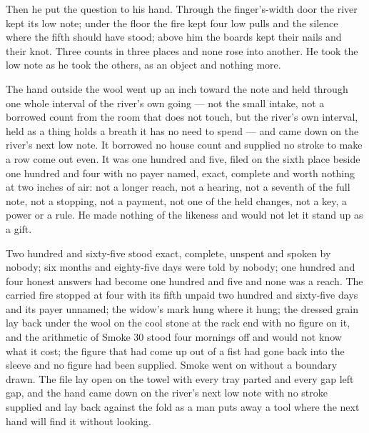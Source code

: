Then he put the question to his hand. Through the finger's-width door the river kept its low note; under the floor the fire kept four low pulls and the silence where the fifth should have stood; above him the boards kept their nails and their knot. Three counts in three places and none rose into another. He took the low note as he took the others, as an object and nothing more.

The hand outside the wool went up an inch toward the note and held through one whole interval of the river's own going --- not the small intake, not a borrowed count from the room that does not touch, but the river's own interval, held as a thing holds a breath it has no need to spend --- and came down on the river's next low note. It borrowed no house count and supplied no stroke to make a row come out even. It was one hundred and five, filed on the sixth place beside one hundred and four with no payer named, exact, complete and worth nothing at two inches of air: not a longer reach, not a hearing, not a seventh of the full note, not a stopping, not a payment, not one of the held changes, not a key, a power or a rule. He made nothing of the likeness and would not let it stand up as a gift.

Two hundred and sixty-five stood exact, complete, unspent and spoken by nobody; six months and eighty-five days were told by nobody; one hundred and four honest answers had become one hundred and five and none was a reach. The carried fire stopped at four with its fifth unpaid two hundred and sixty-five days and its payer unnamed; the widow's mark hung where it hung; the dressed grain lay back under the wool on the cool stone at the rack end with no figure on it, and the arithmetic of Smoke 30 stood four mornings off and would not know what it cost; the figure that had come up out of a fist had gone back into the sleeve and no figure had been supplied. Smoke went on without a boundary drawn. The file lay open on the towel with every tray parted and every gap left gap, and the hand came down on the river's next low note with no stroke supplied and lay back against the fold as a man puts away a tool where the next hand will find it without looking.
